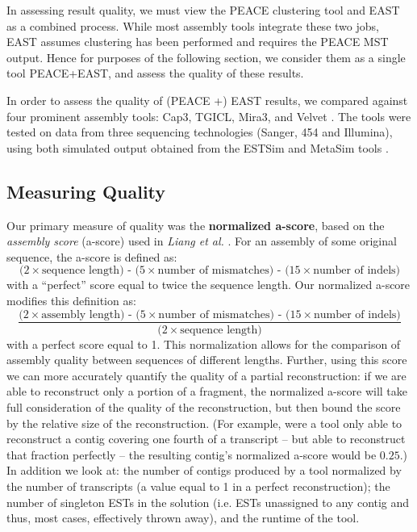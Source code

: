 \documentclass[10pt]{bmc_article}
\newcommand{\peace} {{\small PEACE}}
\newcommand{\capthree} {{\small Cap3}}
\newcommand{\estsim}{{\small ESTSim}}
\newcommand{\metasim} {{\small MetaSim}}
\newcommand{\tgicl} {{\small TGICL}}
\newcommand{\east} {{\small EAST}}
\newcommand{\velvet}{{\small Velvet}}
\newcommand{\mira}{{\small Mira3}}
\newcommand{\peast}{{\small PEACE+EAST}}
\newenvironment{bmcformat}{\begin{raggedright}\baselineskip20pt\sloppy\setboolean{publ}{false}}{\end{raggedright}\baselineskip20pt\sloppy}
\begin{document}
\begin{bmcformat}
In assessing result quality, we must view the \peace\/ clustering tool
\cite{Rao10} and \east\/ as a combined process.  While most assembly
tools integrate these two jobs, \east\/ assumes clustering has been
performed and requires the \peace\/ MST output.  Hence for purposes of
the following section, we consider them as a single tool \peast, and
assess the quality of these results.

\vspace{3mm}

In order to assess the quality of (\peace\/ +) \east\/ results, we compared
against four prominent assembly tools: \capthree, \tgicl,
\mira, and \velvet\/ \cite{Huang99,Pertea03,Chevreux04,Zerbino08}.  The tools were tested on data from three
sequencing technologies (Sanger, 454 and Illumina), using both
simulated output obtained from the \estsim\/ and \metasim\/ tools
\cite{Hazelhurst03,Richter08}.  


\subsection*{Measuring Quality}
Our primary measure of quality was the {\bf normalized a-score}, based
on the {\it assembly score} (a-score) used in {\it Liang et al.}
\cite{Liang00}.  For an assembly of some original sequence, the
a-score is defined as:
$$\mbox{($2\times$sequence length) - ($5\times$number of
mismatches) - ($15 \times$number of indels)}$$
with a ``perfect'' score equal to twice the sequence length.  Our
normalized a-score modifies this definition as:
$$\frac{\mbox{($2\times$assembly length) - ($5\times$number of mismatches)
    - ($15\times$number of indels)}}{\mbox{($2\times$sequence
    length)}}$$ with a perfect score equal to 1.  This normalization
allows for the comparison of assembly quality between sequences of
different lengths. Further, using this score we can more accurately
quantify the quality of a partial reconstruction: if we are able to
reconstruct only a portion of a fragment, the normalized a-score will
take full consideration of the quality of the reconstruction, but then
bound the score by the relative size of the reconstruction.
(For example, were a tool only able to reconstruct a
  contig covering one fourth of a transcript -- but able to
  reconstruct that fraction perfectly -- the resulting contig's
  normalized a-score would be $0.25$.)  In addition we look at: the
number of contigs produced by a tool normalized by the number of
transcripts (a value equal to 1 in a perfect reconstruction); the
number of singleton ESTs in the solution (i.e. ESTs unassigned to any
contig and thus, most cases, effectively thrown away), and the runtime
of the tool.


\end{bmcformat}
\end{document}
